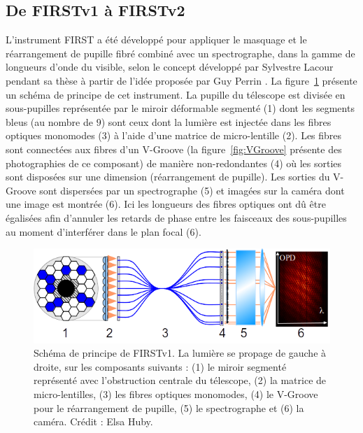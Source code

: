 \subsection{De FIRSTv1 à FIRSTv2}

L'instrument \ac{FIRST} a été développé \citep{kotani2008} pour appliquer le masquage et le réarrangement de pupille fibré combiné avec un spectrographe, dans la gamme de longueurs d'onde du visible, selon le concept développé par Sylvestre Lacour pendant sa thèse \citep{lacour2010} à partir de l'idée proposée par Guy Perrin \citep{perrin2006}. La figure~\ref{fig:FIRSTv1Scheme} présente un schéma de principe de cet instrument. La pupille du télescope est divisée en sous-pupilles représentée par le miroir déformable segmenté (1) dont les segments bleus (au nombre de $9$) sont ceux dont la lumière est injectée dans les fibres optiques monomodes (3) à l'aide d'une matrice de micro-lentille (2). Les fibres sont connectées aux fibres d'un V-Groove (la figure~\ref{fig:VGroove} présente des photographies de ce composant) de manière non-redondantes (4) où les sorties sont disposées sur une dimension (réarrangement de pupille). Les sorties du V-Groove sont dispersées par un spectrographe (5) et imagées sur la caméra dont une image est montrée (6). Ici les longueurs des fibres optiques ont dû être égalisées afin d'annuler les retards de phase entre les faisceaux des sous-pupilles au moment d'interférer dans le plan focal (6).

\begin{figure}[ht!]
    \centering
    \includegraphics[width=\figwidth]{Figure_Chap1/FIRSTv1Scheme_36Outputs_Fringes_b.png}
    \caption[Schéma de principe de FIRSTv1.]{Schéma de principe de FIRSTv1. La lumière se propage de gauche à droite, sur les composants suivants : (1) le miroir segmenté représenté avec l'obstruction centrale du télescope, (2) la matrice de micro-lentilles, (3) les fibres optiques monomodes, (4) le V-Groove pour le réarrangement de pupille, (5) le spectrographe et (6) la caméra. Crédit : Elsa Huby.}
    \label{fig:FIRSTv1Scheme}
\end{figure}

